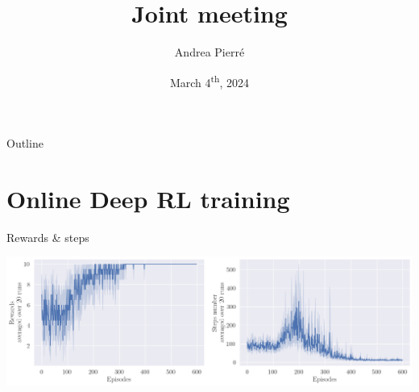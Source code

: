 \documentclass[bigger]{beamer}
\author{Andrea Pierré}
\date{March 4\textsuperscript{th}, 2024}
\title{Joint meeting}
\institute{Brown University}
\begin{document}
\maketitle
\begin{frame}[plain]{Outline}
\tableofcontents
\end{frame}

\section{Online Deep RL training}
\label{sec:orgbb39dbe}
\begin{frame}[label={sec:org2ae60de}]{Rewards \& steps}
\begin{center}
\includegraphics[width=\linewidth]{img/steps-and-rewards.png}
\end{center}
\end{frame}
\end{document}
